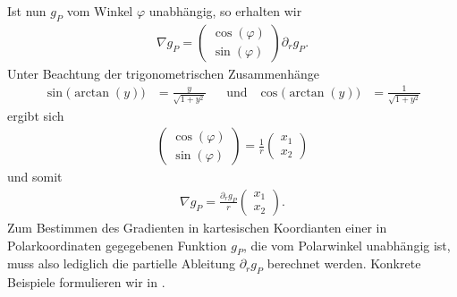 Ist nun $g_P$ vom Winkel $\varphi$ unabhängig, so erhalten wir
\begin{align*}
  \nabla g_P 
  = 
  \begin{pmatrix}
    \cos(\varphi)\\
    \sin(\varphi)
  \end{pmatrix}
  \partial_r g_P.
\end{align*}
Unter Beachtung der trigonometrischen Zusammenhänge
\begin{align*}
  \sin\big(\arctan(y)\big) &= \frac{y}{\sqrt{1+y^2}} &&\text{und}
  &\cos\big(\arctan(y)\big) &= \frac{1}{\sqrt{1+y^2}}
\end{align*}
ergibt sich 
\begin{align*}
  \begin{pmatrix}
    \cos(\varphi)\\
    \sin(\varphi)
  \end{pmatrix}
  = 
  \frac{1}{r}
  \begin{pmatrix}
    x_1\\
    x_2
  \end{pmatrix}
\end{align*}
und somit 
\begin{align*}
  \nabla g_P
  = 
  \frac{\partial_r g_P}{r}
  \begin{pmatrix}
    x_1\\
    x_2
  \end{pmatrix}.
\end{align*} 
Zum Bestimmen des Gradienten in kartesischen Koordianten einer
in Polarkoordinaten gegegebenen Funktion $g_P$, die
vom Polarwinkel unabhängig ist, muss also lediglich 
die partielle Ableitung $\partial_r g_P$ berechnet werden.
Konkrete Beispiele formulieren wir in .
